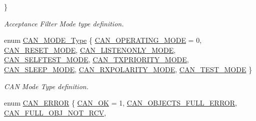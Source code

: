 \begin{DoxyCompactItemize}
 \}
\begin{DoxyCompactList}\small\item\em \-Acceptance \-Filter \-Mode type definition. \end{DoxyCompactList}\item 
enum \hyperlink{group___c_a_n___public___types_ga0d26bc8676971e4fa5cc30fef59a42b9}{\-C\-A\-N\-\_\-\-M\-O\-D\-E\-\_\-\-Type} \{ \*
\hyperlink{group___c_a_n___public___types_gga0d26bc8676971e4fa5cc30fef59a42b9aa8e7350d9f4f3a3f335069226ba6e8f6}{\-C\-A\-N\-\_\-\-O\-P\-E\-R\-A\-T\-I\-N\-G\-\_\-\-M\-O\-D\-E} =  0, 
\hyperlink{group___c_a_n___public___types_gga0d26bc8676971e4fa5cc30fef59a42b9a398cd9777634ece5fcbab4df3cf3a526}{\-C\-A\-N\-\_\-\-R\-E\-S\-E\-T\-\_\-\-M\-O\-D\-E}, 
\hyperlink{group___c_a_n___public___types_gga0d26bc8676971e4fa5cc30fef59a42b9a14e7054fb7446b8f82a2b23e059fb7f4}{\-C\-A\-N\-\_\-\-L\-I\-S\-T\-E\-N\-O\-N\-L\-Y\-\_\-\-M\-O\-D\-E}, 
\hyperlink{group___c_a_n___public___types_gga0d26bc8676971e4fa5cc30fef59a42b9abdca353874fc8859b6d8d84fc8650b51}{\-C\-A\-N\-\_\-\-S\-E\-L\-F\-T\-E\-S\-T\-\_\-\-M\-O\-D\-E}, 
\*
\hyperlink{group___c_a_n___public___types_gga0d26bc8676971e4fa5cc30fef59a42b9a0a43df9a608ccb6865b8ceae0624aa5b}{\-C\-A\-N\-\_\-\-T\-X\-P\-R\-I\-O\-R\-I\-T\-Y\-\_\-\-M\-O\-D\-E}, 
\hyperlink{group___c_a_n___public___types_gga0d26bc8676971e4fa5cc30fef59a42b9ad4b949fba84b06206011287e25a69480}{\-C\-A\-N\-\_\-\-S\-L\-E\-E\-P\-\_\-\-M\-O\-D\-E}, 
\hyperlink{group___c_a_n___public___types_gga0d26bc8676971e4fa5cc30fef59a42b9a7059272e58c589754cdadc980866056d}{\-C\-A\-N\-\_\-\-R\-X\-P\-O\-L\-A\-R\-I\-T\-Y\-\_\-\-M\-O\-D\-E}, 
\hyperlink{group___c_a_n___public___types_gga0d26bc8676971e4fa5cc30fef59a42b9a7a621122f70de0ed611cee6827ad05c9}{\-C\-A\-N\-\_\-\-T\-E\-S\-T\-\_\-\-M\-O\-D\-E}
 \}
\begin{DoxyCompactList}\small\item\em \-C\-A\-N \-Mode \-Type definition. \end{DoxyCompactList}\item 
enum \hyperlink{group___c_a_n___public___types_ga1d9859e6b360c9448574f86ea199a112}{\-C\-A\-N\-\_\-\-E\-R\-R\-O\-R} \{ \*
\hyperlink{group___c_a_n___public___types_gga1d9859e6b360c9448574f86ea199a112ab7db0e53b737c0839be931efcb79246e}{\-C\-A\-N\-\_\-\-O\-K} =  1, 
\hyperlink{group___c_a_n___public___types_gga1d9859e6b360c9448574f86ea199a112a04a1be23d872c7a95c106c1ccbb08bff}{\-C\-A\-N\-\_\-\-O\-B\-J\-E\-C\-T\-S\-\_\-\-F\-U\-L\-L\-\_\-\-E\-R\-R\-O\-R}, 
\hyperlink{group___c_a_n___public___types_gga1d9859e6b360c9448574f86ea199a112a225b505587b481bccfe506efbe5109dd}{\-C\-A\-N\-\_\-\-F\-U\-L\-L\-\_\-\-O\-B\-J\-\_\-\-N\-O\-T\-\_\-\-R\-C\-V}, 

\end{DoxyCompactItemize}
